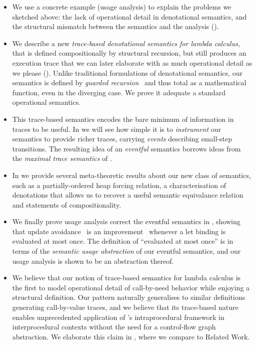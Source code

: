 \begin{itemize}
\item We use a concrete example (usage analysis) to explain the problems we sketched
  above: the lack of operational detail in denotational semantics, and the structural mismatch
  between the semantics and the analysis ().
\item We describe a new \emph{trace-based denotational semantics for lambda calculus},
  that is defined compositionally by structural recursion, but still produces an execution
  trace that we can later elaborate with as much operational detail as we please ().
  Unlike traditional formulations of denotational semantics, our semantics
  is defined by \emph{guarded recursion}~\citep{gdtt} and thus total as a
  mathematical function, even in the diverging case.
  We prove it adequate \wrt a standard operational semantics.
\item This trace-based semantics encodes the bare minimum of information in traces to be useful.
  In  we will see how simple it is to \emph{instrument} our
  semantics to provide richer traces, carrying \emph{events} describing
  small-step transitions.
  The resulting idea of an \emph{eventful} semantics borrows ideas from the
  \emph{maximal trace semantics} of \citet{Cousot:21}.
\item In  we provide several meta-theoretic results about our
  new class of semantics, such as a partially-ordered heap forcing relation,
  a characterisation of denotations that allows us to recover a useful
  semantic equivalance relation and statements of compositionality.
\item We finally prove usage analysis correct \wrt the
  eventful semantics in , showing that update
  avoidance~\citep{Gustavsson:98} is an
  improvement~\citep{MoranSands:99} whenever a let binding is evaluated at
  most once.
  The definition of ``evaluated at most once'' is in terms of the
  \emph{semantic usage abstraction} of our eventful semantics, and
  our usage analysis is shown to be an abstraction thereof.
\item
  We believe that our notion of trace-based semantics for lambda calculus
  is the first to model operational detail of call-by-need behavior while
  enjoying a structural definition. Our pattern naturally generalises
  to similar definitions generating call-by-value traces, and we believe
  that its trace-based nature enables unprecedented application of
  \citeauthor{Cousot:21}'s intraprocedural framework in interprocedural
  contexts without the need for a control-flow graph abstraction.
  We elaborate this claim in , where we compare to
  Related Work.
\end{itemize}


